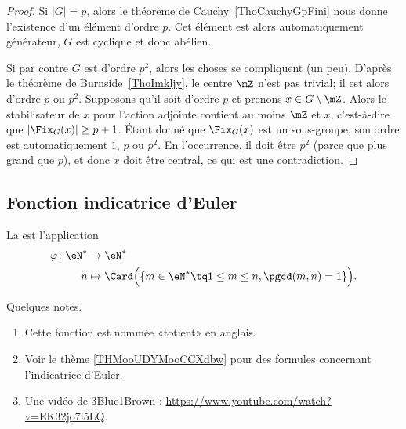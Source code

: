 \begin{proof}
	Si \( | G |=p\), alors le théorème de Cauchy~\ref{ThoCauchyGpFini} nous donne l'existence d'un élément d'ordre \( p\). Cet élément est alors automatiquement générateur, \( G\) est cyclique et donc abélien.

	Si par contre \( G\) est d'ordre \( p^2\), alors les choses se compliquent (un peu). D'après le théorème de Burnside~\ref{ThoImkljy}, le centre \( \mZ\) n'est pas trivial; il est alors d'ordre \( p\) ou \( p^2\). Supposons qu'il soit d'ordre \( p\) et prenons \( x\in G\setminus\mZ\). Alors le stabilisateur de \( x\) pour l'action adjointe contient au moins \( \mZ\) et \( x\), c'est-à-dire que \( |\Fix_G(x)|\geq p+1\). Étant donné que \( \Fix_G(x)\) est un sous-groupe, son ordre est automatiquement \( 1\), \( p\) ou \( p^2\). En l'occurrence, il doit être \( p^2\) (parce que plus grand que \( p\)), et donc \( x\) doit être central, ce qui est une contradiction.
\end{proof}


\subsection{Fonction indicatrice d'Euler}

\begin{definition}		\label{DEFooZRYMooZCozga}
	La  est l'application
	\begin{equation}
		\begin{aligned}
			\varphi\colon \eN^* & \to \eN^*                                                                    \\
			n                   & \mapsto \Card\Big(   \{ m\in \eN^*\tq 1\leq m\leq n, \pgcd(m,n)=1 \}  \Big).
		\end{aligned}
	\end{equation}
\end{definition}

\begin{normaltext}
	Quelques notes.
	\begin{enumerate}
		\item
		      Cette fonction est nommée «totient» en anglais.
		\item
		      Voir le thème \ref{THMooUDYMooCCXdbw} pour des formules concernant l'indicatrice d'Euler.
		\item

		      Une vidéo de 3Blue1Brown : \url{https://www.youtube.com/watch?v=EK32jo7i5LQ}.
	\end{enumerate}
\end{normaltext}

